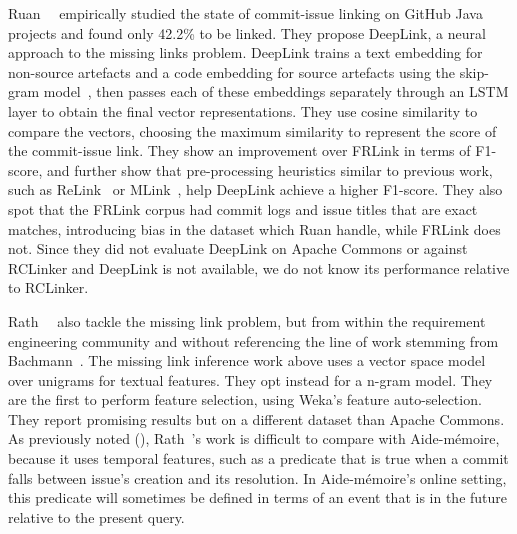 Ruan~\etal~\cite{ruan2019deeplink} empirically studied the state of commit-issue
linking on GitHub Java projects and found only 42.2\% to be linked. They propose
DeepLink, a neural approach to the missing links problem. DeepLink trains a text
embedding for non-source artefacts and a code embedding for source artefacts
using the skip-gram model~\cite{mikolov2013efficient, mikolov2013distributed},
then passes each of these embeddings separately through an LSTM layer to obtain
the final vector representations. They use cosine similarity to compare the
vectors, choosing the maximum similarity to represent the score of the
commit-issue link. They show an improvement over FRLink in terms of F1-score,
and further show that pre-processing heuristics similar to previous work, such
as ReLink~\cite{relink} or MLink~\cite{MLink}, help DeepLink achieve a higher
F1-score. They also spot that the FRLink corpus had commit logs and issue titles
that are exact matches, introducing bias in the dataset which Ruan \etal handle,
while FRLink does not. Since they did not evaluate DeepLink on Apache Commons or
against RCLinker and DeepLink is not available, we do not know its performance
relative to RCLinker.

Rath~\etal~\cite{1804.02433} also tackle the missing link problem, but from
within the requirement engineering community and without referencing the line of
work stemming from Bachmann~\etal. The missing link inference work above uses a
vector space model over unigrams for textual features. They opt instead for a
n-gram model. They are the first to perform feature selection, using Weka's
feature auto-selection. They report promising results but on a different dataset
than Apache Commons. As previously noted (),
Rath~\etal's work is difficult to compare with Aide-mémoire, because it uses
temporal features, such as a predicate that is true when a commit falls between
issue's creation and its resolution. In Aide-mémoire's online setting, this
predicate will sometimes be defined in terms of an event that is in the future
relative to the present query.

